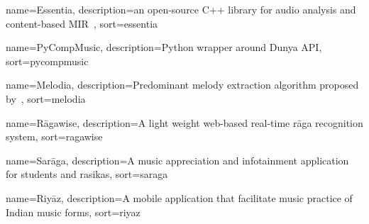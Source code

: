 
{
	name={Essentia},
	description={an open-source C++ library for audio analysis and content-based MIR~\citep{essentia}},
	sort=essentia
}

{
	name={PyCompMusic},
	description={Python wrapper around Dunya API},
	sort=pycompmusic
}

{
	name={Melodia},
	description={Predominant melody extraction algorithm proposed by~\cite{Salamon2012}},
	sort=melodia
}

{
	name={R\={a}gawise},
	description={A light weight web-based real-time r\={a}ga recognition system},
	sort=ragawise
}	

{
	name={Sar\={a}ga},
	description={A music appreciation and infotainment application for students and rasikas},
	sort=saraga
}

{
	name={Riy\={a}z},
	description={A mobile application that facilitate music practice of Indian music forms},
	sort=riyaz
}


